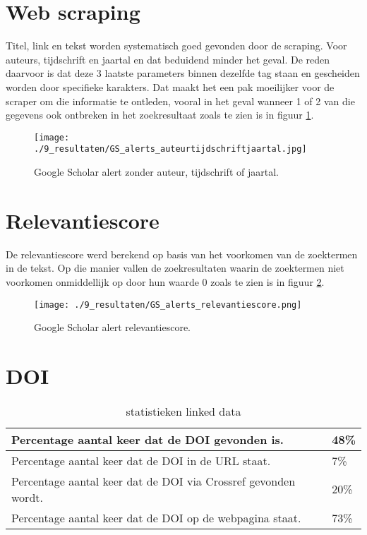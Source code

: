 \section{Web scraping}
Titel, link en tekst worden systematisch goed gevonden door de scraping. Voor auteurs, tijdschrift en jaartal en dat beduidend minder het geval. De reden daarvoor is dat deze 3 laatste parameters binnen dezelfde tag staan en gescheiden worden door specifieke karakters. Dat maakt het een pak moeilijker voor de scraper om die informatie te  ontleden, vooral in het geval wanneer 1 of 2 van die gegevens ook ontbreken in het zoekresultaat zoals te zien is in figuur \ref{fig:GSauteurtijdschriftjaartal}.
\begin{figure}[h!]
    \centering
    \texttt{[image: ./9\_resultaten/GS\_alerts\_auteurtijdschriftjaartal.jpg]}
    \caption[Google Scholar alert zonder auteur, tijdschrift of jaartal.]{\label{fig:GSauteurtijdschriftjaartal}Google Scholar alert zonder auteur, tijdschrift of jaartal.}
\end{figure}

\section{Relevantiescore}
De relevantiescore werd berekend op basis van het voorkomen van de zoektermen in de tekst. Op die manier vallen de zoekresultaten waarin de zoektermen niet voorkomen onmiddellijk op door hun waarde 0 zoals te zien is in figuur  \ref{fig:GSrelevantie}.
\begin{figure}[h!]
    \centering
    \texttt{[image: ./9\_resultaten/GS\_alerts\_relevantiescore.png]}
    \caption[Google Scholar alert relevantiescore.]{\label{fig:GSrelevantie}Google Scholar alert relevantiescore.}
\end{figure}

\section{DOI}
\begin{table}[h!]
    \caption{statistieken linked data}
    \centering
    \begin{tabularx}{\textwidth}{|X|p{4cm}|} 
        \hline
        Percentage aantal keer dat de DOI gevonden is.&48\%\\
        \hline
        Percentage aantal keer dat de DOI in de URL staat.&7\%\\
        \hline
        Percentage aantal keer dat de DOI via Crossref gevonden wordt.&20\%\\
        \hline
        Percentage aantal keer dat de DOI op de webpagina staat.&73\%\\
        \hline
    \end{tabularx}
    \label{table:statistieken_linked_data}
\end{table}

